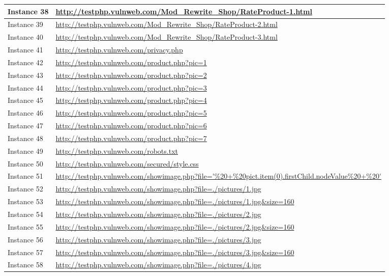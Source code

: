 \documentclass[12pt]{article}
\begin{document}
\begin{center}
\begin{longtable}{|l|p{10cm}|}
\hline
Instance 38 & \url{http://testphp.vulnweb.com/Mod\_Rewrite\_Shop/RateProduct-1.html} \\
\hline
Instance 39 & \url{http://testphp.vulnweb.com/Mod\_Rewrite\_Shop/RateProduct-2.html} \\
\hline
Instance 40 & \url{http://testphp.vulnweb.com/Mod\_Rewrite\_Shop/RateProduct-3.html} \\
\hline
Instance 41 & \url{http://testphp.vulnweb.com/privacy.php} \\
\hline
Instance 42 & \url{http://testphp.vulnweb.com/product.php?pic=1} \\
\hline
Instance 43 & \url{http://testphp.vulnweb.com/product.php?pic=2} \\
\hline
Instance 44 & \url{http://testphp.vulnweb.com/product.php?pic=3} \\
\hline
Instance 45 & \url{http://testphp.vulnweb.com/product.php?pic=4} \\
\hline
Instance 46 & \url{http://testphp.vulnweb.com/product.php?pic=5} \\
\hline
Instance 47 & \url{http://testphp.vulnweb.com/product.php?pic=6} \\
\hline
Instance 48 & \url{http://testphp.vulnweb.com/product.php?pic=7} \\
\hline
Instance 49 & \url{http://testphp.vulnweb.com/robots.txt} \\
\hline
Instance 50 & \url{http://testphp.vulnweb.com/secured/style.css} \\
\hline
Instance 51 & \url{http://testphp.vulnweb.com/showimage.php?file='\%20+\%20pict.item(0).firstChild.nodeValue\%20+\%20'} \\
\hline
Instance 52 & \url{http://testphp.vulnweb.com/showimage.php?file=./pictures/1.jpg} \\
\hline
Instance 53 & \url{http://testphp.vulnweb.com/showimage.php?file=./pictures/1.jpg\&size=160} \\
\hline
Instance 54 & \url{http://testphp.vulnweb.com/showimage.php?file=./pictures/2.jpg} \\
\hline
Instance 55 & \url{http://testphp.vulnweb.com/showimage.php?file=./pictures/2.jpg\&size=160} \\
\hline
Instance 56 & \url{http://testphp.vulnweb.com/showimage.php?file=./pictures/3.jpg} \\
\hline
Instance 57 & \url{http://testphp.vulnweb.com/showimage.php?file=./pictures/3.jpg\&size=160} \\
\hline
Instance 58 & \url{http://testphp.vulnweb.com/showimage.php?file=./pictures/4.jpg} \\

\end{longtable}
\end{center}
\end{document}
